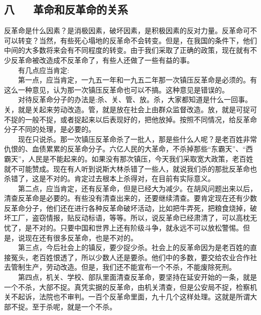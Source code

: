 \documentclass[cn,11pt,chinese]{elegantbook}
\def\myformat#1{\hfil\hfil #1}
\begin{document}
\subsection*{\myformat{八 　  革命和反革命的关系}}
反革命是什么因素？是消极因素，破坏因素，是积极因素的反对力量。反革命可不可以转变？当然，有些死心塌地的反革命不会转变。但是，在我国的条件下，他们中间的大多数将来会有不同程度的转变。由于我们采取了正确的政策，现在就有不少反革命被改造成不反革命了，有些人还做了一些有益的事。\\
　　有几点应当肯定:\\
　　第一点，应当肯定，一九五一年和一九五二年那一次镇压反革命是必须的。有这么一种意见，认为那一次镇压反革命也可以不搞。这种意见是错误的。\\
　　对待反革命分子的办法是:杀、关、管、放。杀，大家都知道是什么一回事。关，就是关起来劳动改造。管，就是放在社会上由群众监督改造。放，就是可捉可不捉的一般不捉，或者捉起来以后表现好的，把他放掉。按照不同情况，给反革命分子不同的处理，是必要的。\\
　　现在只说杀。那一次镇压反革命杀了一批人，那是些什么人呢？是老百姓非常仇恨的、血债累累的反革命分子。六亿人民的大革命，不杀掉那些“东霸天”、“西霸天”，人民是不能起来的。如果没有那次镇压，今天我们采取宽大政策，老百姓就不可能赞成。现在有人听到说斯大林杀错了一些人，就说我们杀的那批反革命也杀错了，这是不对的。肯定过去根本上杀得对，在目前有实际意义。\\
　　第二点，应当肯定，还有反革命，但是已经大为减少。在胡风问题出来以后，清查反革命是必要的。有些没有清查出来的，还要继续清查。要肯定现在还有少数反革命分子，他们还在进行各种反革命破坏活动，比如把牛弄死，把粮食烧掉，破坏工厂，盗窃情报，贴反动标语，等等。所以，说反革命已经肃清了，可以高枕无忧了，是不对的。只要中国和世界上还有阶级斗争，就永远不可以放松警惕。但是，说现在还有很多反革命，也是不对的。\\
　　第三点，今后社会上的镇反，要少捉少杀。社会上的反革命因为是老百姓的直接冤头，老百姓恨透了，所以少数人还是要杀。他们中的多数，要交给农业合作社去管制生产，劳动改造。但是，我们还不能宣布一个不杀，不能废除死刑。\\
　　第四点，机关、学校、部队里面清查反革命，要坚持在延安开始的一条，就是一个不杀，大部不捉。真凭实据的反革命，由机关清查，但是公安局不捉，检察机关不起诉，法院也不审判。一百个反革命里面，九十几个这样处理。这就是所谓大部不捉。至于杀呢，就是一个不杀。\\
\end{document}
